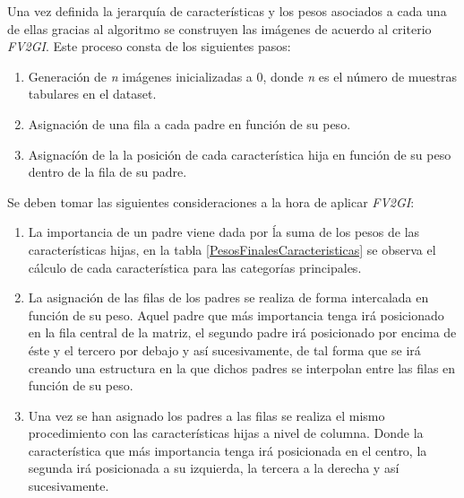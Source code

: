         Una vez definida la jerarquía de características y los pesos asociados a cada una de ellas gracias al algoritmo  se construyen las imágenes de acuerdo al criterio \textit{FV2GI}. Este proceso consta de los siguientes pasos:

        \begin{enumerate}

            \item Generación de \textit{n} imágenes inicializadas a 0, donde \textit{n} es el número de muestras tabulares en el dataset.
            \item Asignación de una fila a cada padre en función de su peso.
            \item Asignacíón de la la posición de cada característica hija en función de su peso dentro de la fila de su padre.
        
        \end{enumerate}

        Se deben tomar las siguientes consideraciones a la hora de aplicar \textit{FV2GI}:

        \begin{enumerate}

            \item La importancia de un padre viene dada por ĺa suma de los pesos de las características hijas, en la tabla \ref{PesosFinalesCaracteristicas} se observa el cálculo de cada característica para las categorías principales.

            \item La asignación de las filas de los padres se realiza de forma intercalada en función de su peso. Aquel padre que más importancia tenga irá posicionado en la fila central de la matriz, el segundo padre irá posicionado por encima de éste y el tercero por debajo y así sucesivamente, de tal forma que se irá creando una estructura en la que dichos padres se interpolan entre las filas en función de su peso.

            \item Una vez se han asignado los padres a las filas se realiza el mismo procedimiento con las características hijas a nivel de columna. Donde la característica que más importancia tenga irá posicionada en el centro, la segunda irá posicionada a su izquierda, la tercera a la derecha y así sucesivamente.
        \end{enumerate}


